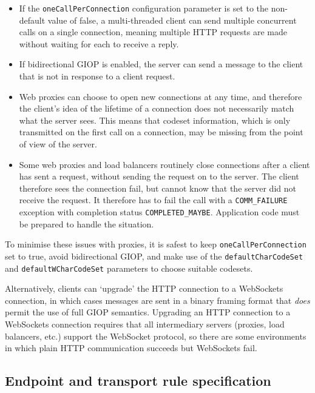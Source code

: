 \documentclass[11pt,oneside,a4paper]{book}
\newcommand{\code}[1]{\texttt{#1}}
\begin{document}
\begin{itemize}

  \item If the \code{oneCallPerConnection} configuration parameter is
    set to the non-default value of false, a multi-threaded client can
    send multiple concurrent calls on a single connection, meaning
    multiple HTTP requests are made without waiting for each to
    receive a reply.

  \item If bidirectional GIOP is enabled, the server can send a
    message to the client that is not in response to a client request.

  \item Web proxies can choose to open new connections at any time,
    and therefore the client's idea of the lifetime of a connection
    does not necessarily match what the server sees. This means that
    codeset information, which is only transmitted on the first call on a
    connection, may be missing from the point of view of the server.

  \item Some web proxies and load balancers routinely close
    connections after a client has sent a request, without sending the
    request on to the server. The client therefore sees the connection
    fail, but cannot know that the server did not receive the
    request. It therefore has to fail the call with a
    \code{COMM\_FAILURE} exception with completion status
    \code{COMPLETED\_MAYBE}. Application code must be prepared to
    handle the situation.
    
\end{itemize}

To minimise these issues with proxies, it is safest to keep
\code{oneCallPerConnection} set to true, avoid bidirectional GIOP, and
make use of the \code{defaultCharCodeSet} and
\code{defaultWCharCodeSet} parameters to choose suitable codesets.

Alternatively, clients can `upgrade' the HTTP connection to a
WebSockets connection, in which cases messages are sent in a binary
framing format that \emph{does} permit the use of full GIOP semantics.
Upgrading an HTTP connection to a WebSockets connection requires that
all intermediary servers (proxies, load balancers, etc.)  support the
WebSocket protocol, so there are some environments in which plain HTTP
communication succeeds but WebSockets fail.


\subsection{Endpoint and transport rule specification}
\end{document}
